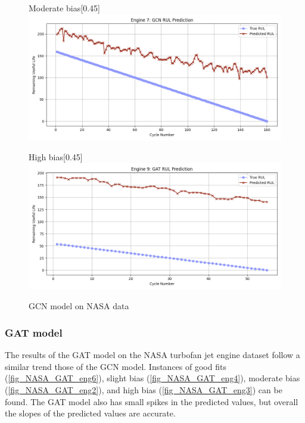 \documentclass[12pt]{article}
\begin{document}
\begin{figure}[H]
    \begin{subcaptionbox}{Moderate bias\label{fig_NASA_GCN_eng2}}[0.45\textwidth]
        {\includegraphics[width=\linewidth]{figures/NASA/NASA_GCN_eng2.png}}
    \end{subcaptionbox}
    \hfill
    \begin{subcaptionbox}{High bias\label{fig_NASA_GCN_eng3}}[0.45\textwidth]
        {\includegraphics[width=\linewidth]{figures/NASA/NASA_GAT_eng3.png}}
    \end{subcaptionbox}

    \caption{GCN model on NASA data}
    \label{GCN_NASA_all}
\end{figure}


\subsubsection{GAT model}

The results of the GAT model on the NASA turbofan jet engine dataset follow a similar trend those of the GCN model. Instances of good fits (\autoref{fig_NASA_GAT_eng6}), slight bias (\autoref{fig_NASA_GAT_eng4}), moderate bias (\autoref{fig_NASA_GAT_eng2}), and high bias (\autoref{fig_NASA_GAT_eng3}) can be found. The GAT model also has small spikes in the predicted values, but overall the slopes of the predicted values are accurate.
\end{document}
